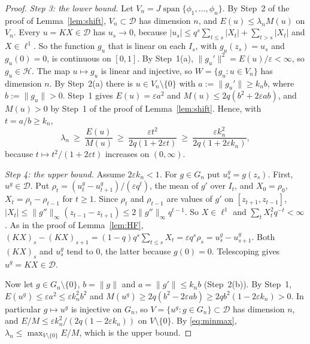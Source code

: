 \documentclass[11pt]{article}
\theoremstyle{plain}
\theoremstyle{definition}
\theoremstyle{remark}
\begin{document}
\begin{proof}
\emph{Step 3: the lower bound.} Let $V_n=J\operatorname{span}\{\phi_1,\dots,\phi_n\}$. By Step~2 of
the proof of Lemma~\ref{lem:shift}, $V_n\subset\mathcal D$ has dimension $n$, and $E(u)\le\lambda_nM(u)$
on $V_n$. Every $u=KX\in\mathcal D$ has $u_s\to0$, because
$|u_s|\le q^s\sum_{t\le s}|X_t|+\sum_{t>s}|X_t|$ and $X\in\ell^1$. So the function $g_u$ that is
linear on each $I_s$, with $g_u(z_s)=u_s$ and $g_u(0)=0$, is continuous on $[0,1]$. By Step~1(a),
$\|g_u'\|^2=E(u)/\varepsilon<\infty$, so $g_u\in\mathcal H$. The map $u\mapsto g_u$ is linear and
injective, so $W=\{g_u:u\in V_n\}$ has dimension $n$. By Step~2(a) there is $u\in V_n\setminus\{0\}$
with $a:=\|g_u'\|\ge k_n b$, where $b:=\|g_u\|>0$. Step~1 gives $E(u)=\varepsilon a^2$ and
$M(u)\le2q(b^2+2\varepsilon ab)$, and $M(u)>0$ by Step~1 of the proof of Lemma~\ref{lem:shift}.
Hence, with $t=a/b\ge k_n$,
\[
   \lambda_n\ \ge\ \frac{E(u)}{M(u)}\ \ge\ \frac{\varepsilon t^2}{2q(1+2\varepsilon t)}
   \ \ge\ \frac{\varepsilon k_n^2}{2q(1+2\varepsilon k_n)} ,
\]
because $t\mapsto t^2/(1+2\varepsilon t)$ increases on $(0,\infty)$.

\emph{Step 4: the upper bound.} Assume $2\varepsilon k_n<1$. For $g\in G_n$ put $u^g_s=g(z_s)$. First,
$u^g\in\mathcal D$. Put $\rho_t=(u^g_t-u^g_{t+1})/(\varepsilon q^t)$, the mean of $g'$ over $I_t$,
and $X_0=\rho_0$, $X_t=\rho_t-\rho_{t-1}$ for $t\ge1$. Since $\rho_t$ and $\rho_{t-1}$ are values of
$g'$ on $[z_{t+1},z_{t-1}]$, $|X_t|\le\|g''\|_\infty(z_{t-1}-z_{t+1})\le2\|g''\|_\infty q^{t-1}$.
So $X\in\ell^1$ and $\sum_tX_t^2q^{-t}<\infty$. As in the proof of Lemma~\ref{lem:HF},
$(KX)_s-(KX)_{s+1}=(1-q)q^s\sum_{t\le s}X_t=\varepsilon q^s\rho_s=u^g_s-u^g_{s+1}$. Both $(KX)_s$
and $u^g_s$ tend to $0$, the latter because $g(0)=0$. Telescoping gives $u^g=KX\in\mathcal D$.

Now let $g\in G_n\setminus\{0\}$, $b=\|g\|$ and $a=\|g'\|\le k_nb$ (Step~2(b)). By Step~1,
$E(u^g)\le\varepsilon a^2\le\varepsilon k_n^2b^2$ and
$M(u^g)\ge2q(b^2-2\varepsilon ab)\ge2qb^2(1-2\varepsilon k_n)>0$. In particular $g\mapsto u^g$ is
injective on $G_n$, so $V=\{u^g:g\in G_n\}\subset\mathcal D$ has dimension $n$, and
$E/M\le\varepsilon k_n^2/(2q(1-2\varepsilon k_n))$ on $V\setminus\{0\}$. By \eqref{eq:minmax},
$\lambda_n\le\max_{V\setminus\{0\}}E/M$, which is the upper bound.
\end{proof}
\end{document}
